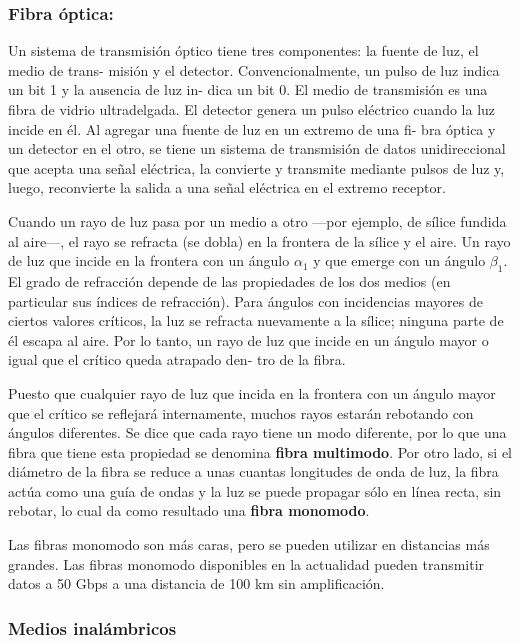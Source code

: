 \subsubsection*{Fibra óptica:}
Un sistema de transmisión óptico tiene tres componentes: la fuente de luz, el medio de trans-
misión y el detector. Convencionalmente, un pulso de luz indica un bit 1 y la ausencia de luz in-
dica un bit 0. El medio de transmisión es una fibra de vidrio ultradelgada. El detector genera un
pulso eléctrico cuando la luz incide en él. Al agregar una fuente de luz en un extremo de una fi-
bra óptica y un detector en el otro, se tiene un sistema de transmisión de datos unidireccional que
acepta una señal eléctrica, la convierte y transmite mediante pulsos de luz y, luego, reconvierte la
salida a una señal eléctrica en el extremo receptor.

Cuando un rayo de luz pasa por un medio a otro —por ejemplo, de sílice fundida al aire—, el rayo se refracta (se dobla) en la frontera de la sílice y el aire. Un rayo de luz que incide en la frontera con un ángulo \(\alpha_1\) y que emerge con un ángulo \(\beta_1\). El grado de refracción depende de las propiedades de los dos medios (en particular sus índices de refracción). Para ángulos con incidencias mayores de ciertos valores críticos, la luz se refracta nuevamente a la sílice; ninguna parte de él escapa al aire. Por lo tanto, un rayo de luz que incide en un ángulo mayor o igual que el crítico queda atrapado den-
tro de la fibra.

Puesto que cualquier rayo de luz que incida en la frontera con un ángulo mayor que el crítico se reflejará internamente, muchos rayos estarán rebotando con ángulos diferentes. Se dice que cada rayo tiene un
modo diferente, por lo que una fibra que tiene esta propiedad se denomina \textbf{fibra multimodo}. Por otro lado, si el diámetro de la fibra se reduce a unas cuantas longitudes de onda de luz, la fibra actúa como una guía de ondas y la luz se puede propagar sólo en línea recta, sin rebotar, lo cual da como resultado una \textbf{fibra monomodo}. 

Las fibras monomodo son más caras, pero se pueden utilizar en distancias más grandes. Las fibras monomodo disponibles en la actualidad pueden transmitir datos a 50 Gbps a una distancia de 100 km sin amplificación.

\subsubsection{Medios inalámbricos}

